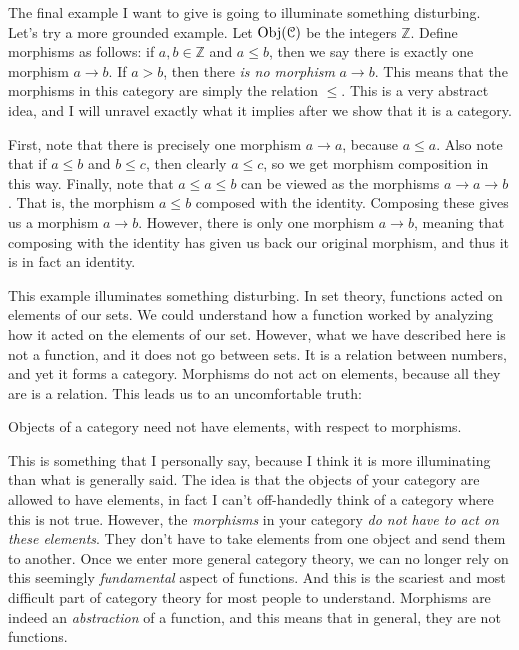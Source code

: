 \documentclass[11pt, letterpaper]{article}
\begin{document}
The final example I want to give is going to illuminate something disturbing. Let's try a more grounded example. Let $\operatorname{Obj}(\mathcal{C} ) $ be the integers $\mathbb{Z} $. Define morphisms as follows: if $a,b\in\mathbb{Z} $ and $a\leq b$, then we say there is exactly one morphism $a\to b$. If $a>b$, then there \emph{is no morphism} $a\to b$. This means that the morphisms in this category are simply the relation $\leq $. This is a very abstract idea, and I will unravel exactly what it implies after we show that it is a category.

First, note that there is precisely one morphism $a\to a$, because $a\leq a$. Also note that if $a\leq b$ and $b\leq c$, then clearly $a\leq c$, so we get morphism composition in this way. Finally, note that $a\leq a\leq b$ can be viewed as the morphisms $a\to a\to b$. That is, the morphism $a\leq b$ composed with the identity. Composing these gives us a morphism $a\to b$. However, there is only one morphism $a\to b$, meaning that composing with the identity has given us back our original morphism, and thus it is in fact an identity.

This example illuminates something disturbing. In set theory, functions acted on elements of our sets. We could understand how a function worked by analyzing how it acted on the elements of our set. However, what we have described here is not a function, and it does not go between sets. It is a relation between numbers, and yet it forms a category. Morphisms do not act on elements, because all they are is a relation. This leads us to an uncomfortable truth:
\begin{displayquote}
	Objects of a category need not have elements, with respect to morphisms.
\end{displayquote}
This is something that I personally say, because I think it is more illuminating than what is generally said. The idea is that the objects of your category are allowed to have elements, in fact I can't off-handedly think of a category where this is not true. However, the \emph{morphisms} in your category \emph{do not have to act on these elements}. They don't have to take elements from one object and send them to another. Once we enter more general category theory, we can no longer rely on this seemingly \emph{fundamental} aspect of functions. And this is the scariest and most difficult part of category theory for most people to understand. Morphisms are indeed an \emph{abstraction} of a function, and this means that in general, they are not functions.
\end{document}
